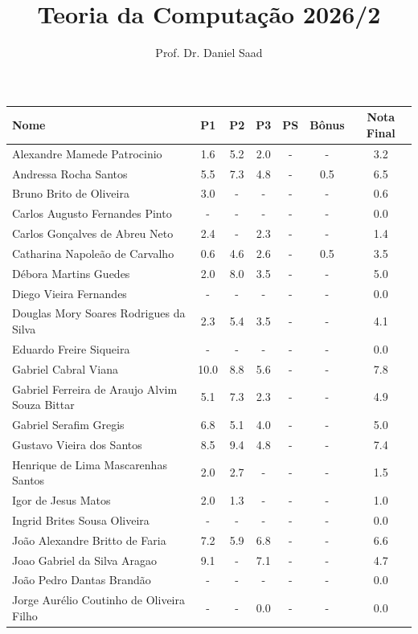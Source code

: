 \documentclass[a4paper]{article}
\title{ Teoria da Computação 2026/2}
\date{}
\author{ Prof. Dr. Daniel Saad}
\begin{document}
 \maketitle
    \begin{longtable}{|l|c|c|c|c|c|c|}
    \hline
Nome & P1 & P2 & P3 & PS & Bônus & Nota Final\\\hline \endhead   
Alexandre Mamede Patrocinio & 1.6 & 5.2 & 2.0 & - & - & 3.2\\\hline
Andressa Rocha Santos & 5.5 & 7.3 & 4.8 & - & 0.5 & 6.5\\\hline
Bruno Brito de Oliveira & 3.0 & - & - & - & - & 0.6\\\hline
Carlos Augusto Fernandes Pinto & - & - & - & - & - & 0.0\\\hline
Carlos Gonçalves de Abreu Neto & 2.4 & - & 2.3 & - & - & 1.4\\\hline
Catharina Napoleão de Carvalho & 0.6 & 4.6 & 2.6 & - & 0.5 & 3.5\\\hline
Débora Martins Guedes & 2.0 & 8.0 & 3.5 & - & - & 5.0\\\hline
Diego Vieira Fernandes & - & - & - & - & - & 0.0\\\hline
Douglas Mory Soares Rodrigues da Silva & 2.3 & 5.4 & 3.5 & - & - & 4.1\\\hline
Eduardo Freire Siqueira & - & - & - & - & - & 0.0\\\hline
Gabriel Cabral Viana & 10.0 & 8.8 & 5.6 & - & - & 7.8\\\hline
Gabriel Ferreira de Araujo Alvim Souza Bittar & 5.1 & 7.3 & 2.3 & - & - & 4.9\\\hline
Gabriel Serafim Gregis & 6.8 & 5.1 & 4.0 & - & - & 5.0\\\hline
Gustavo Vieira dos Santos & 8.5 & 9.4 & 4.8 & - & - & 7.4\\\hline
Henrique de Lima Mascarenhas Santos & 2.0 & 2.7 & - & - & - & 1.5\\\hline
Igor de Jesus Matos & 2.0 & 1.3 & - & - & - & 1.0\\\hline
Ingrid Brites Sousa Oliveira & - & - & - & - & - & 0.0\\\hline
João Alexandre Britto de Faria & 7.2 & 5.9 & 6.8 & - & - & 6.6\\\hline
Joao Gabriel da Silva Aragao & 9.1 & - & 7.1 & - & - & 4.7\\\hline
João Pedro Dantas Brandão & - & - & - & - & - & 0.0\\\hline
Jorge Aurélio Coutinho de Oliveira Filho & - & - & 0.0 & - & - & 0.0\\\hline

\end{longtable}
\end{document}
